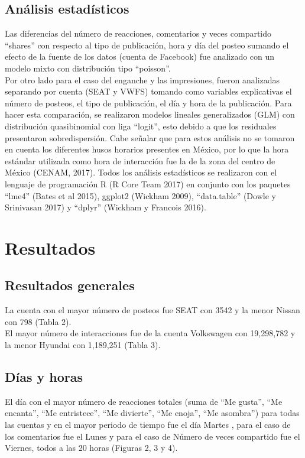 \documentclass[a4paper,10pt]{article}
\begin{document}
\subsection{Análisis estadísticos}
Las diferencias del número de reacciones, comentarios y veces compartido ``shares'' 
con respecto al tipo de publicación, hora y día del posteo sumando el efecto de
la fuente de los datos (cuenta de Facebook) fue analizado con un modelo mixto 
con distribución tipo ``poisson''.\\
Por otro lado para el caso del enganche y las impresiones, fueron 
analizadas separando por cuenta (SEAT y VWFS) tomando como variables
explicativas el número de posteos, el tipo de publicación, el día y hora de 
la publicación. Para hacer esta comparación, se realizaron modelos lineales generalizados (GLM)
con distribución quasibinomial con liga ``logit'', esto debido a que los residuales 
presentaron sobredispersión.
Cabe señalar que para  estos análisis no se tomaron en cuenta
los diferentes husos horarios presentes en México,
por lo que la hora estándar utilizada como hora de interacción 
fue la de la zona del centro de México (CENAM, 2017).
Todos los análisis estadísticos se realizaron con el lenguaje de programación
R (R Core Team 2017) en conjunto con los paquetes ``lme4'' (Bates et al 2015), 
ggplot2 (Wickham 2009), ``data.table'' (Dowle y Srinivasan 2017) y 
``dplyr'' (Wickham y Francois 2016). 



\section{Resultados}
\subsection{Resultados generales}
La cuenta con el mayor número de posteos fue SEAT con 3542 y la menor Nissan con 798 (Tabla 2).\\
El mayor número de interacciones fue de la cuenta Volkswagen con 19,298,782 y la 
menor Hyundai con  1,189,251 (Tabla 3).


\subsection{Días y horas}
El día con el mayor número de reacciones totales (suma de ``Me gusta'', 
``Me encanta'', ``Me entristece'', ``Me divierte'', ``Me enoja'', ``Me asombra'')
para todas las cuentas y en el mayor periodo de tiempo fue el día Martes ,
para el caso de los comentarios fue el Lunes y para el caso
de Número de veces compartido fue el Viernes, todos a las 20 horas (Figuras 2, 3 y 4).
\end{document}
